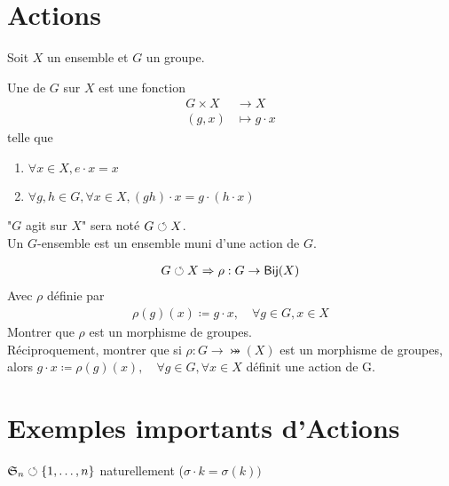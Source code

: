 \documentclass[french,a4paper,10pt]{article}
\begin{document}
	\section{Actions}
	
	Soit $X$ un ensemble et $G$ un groupe.
	
	
	
	\begin{definition}
		Une  de $G$ sur $X$ est une fonction
		\[\begin{aligned}
			G\times X &\to X\\
			(g,x)&\mapsto g\cdot x
		\end{aligned}\]
		telle que 
		\begin{enumerate}[label=$(\roman*)$]
			\item $\forall x\in X, e\cdot x = x$
			
			\item $\forall g,h\in G, \forall x\in X, (gh)\cdot x=g\cdot(h\cdot x)$
		\end{enumerate}
	\end{definition}
	
	
	
	\begin{myremark}
		"$G$ agit sur $X$" sera noté $G\circlearrowleft X$.\\
		Un $G$-ensemble est un ensemble muni d'une action de $G$.
	\end{myremark}
	
	
	\begin{myexercice}
		\[\begin{aligned}
			G\circlearrowleft X\Rightarrow \rho:G\to \operatorname{\mathsf{Bij}}(X)
		\end{aligned}\]
		Avec $\rho$ définie par 
		\[\begin{aligned}
			\rho(g)(x)\coloneq g\cdot x,\quad\forall g\in G, x\in X
		\end{aligned}\]
		Montrer que $\rho$ est un morphisme de groupes.\\
		
		Réciproquement, montrer que si $\rho\colon G\to \bij(X)$ est un morphisme de groupes, alors
		$g\cdot x\coloneq \rho(g)(x),\quad\forall g\in G, \forall x\in X$ définit une action de G.
	\end{myexercice}
	
	\section{Exemples importants d'Actions}
	
	\begin{myexample}
		$\mathfrak S_n \circlearrowleft\{1, \dots, n\}$ naturellement ($\sigma\cdot k=\sigma(k))$
	\end{myexample}
	
\end{document}

